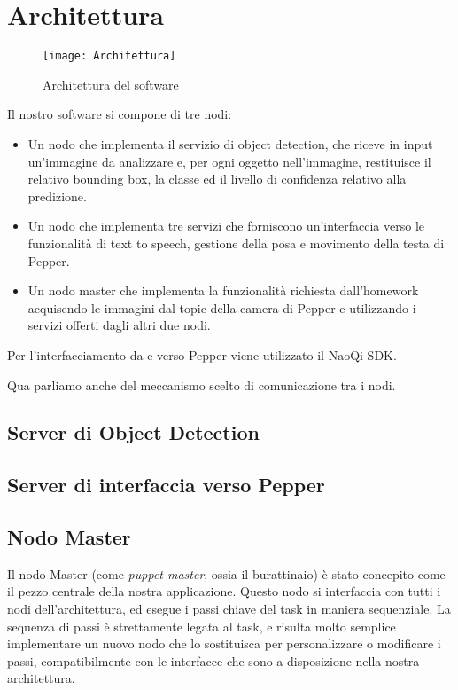 \section{Architettura}

\begin{figure}[ht]
	\centering
	\texttt{[image: Architettura]}
	\caption{Architettura del software}
	\label{fig:architecture}
\end{figure}

Il nostro software si compone di tre nodi:
\begin{itemize}
    \item Un nodo che implementa il servizio di object detection, che riceve in input un’immagine da analizzare e, per ogni oggetto nell’immagine, restituisce il relativo bounding box, la classe ed il livello di confidenza relativo alla predizione.
    \item Un nodo che implementa tre servizi che forniscono un’interfaccia verso le funzionalità di text to speech, gestione della posa e movimento della testa di Pepper.
    \item Un nodo master che implementa la funzionalità richiesta dall’homework acquisendo le immagini dal topic della camera di Pepper e utilizzando i servizi offerti dagli altri due nodi.
\end{itemize}
Per l’interfacciamento da e verso Pepper viene utilizzato il NaoQi SDK.

Qua parliamo anche del meccanismo scelto di comunicazione tra i nodi.


\subsection{Server di Object Detection}

\subsection{Server di interfaccia verso Pepper}

\subsection{Nodo Master}

Il nodo Master (come \emph{puppet master}, ossia il burattinaio) è stato concepito come il pezzo centrale della nostra applicazione. Questo nodo si interfaccia con tutti i nodi dell'architettura, ed esegue i passi chiave del task in maniera sequenziale. La sequenza di passi è strettamente legata al task, e risulta molto semplice implementare un nuovo nodo che lo sostituisca per personalizzare o modificare i passi, compatibilmente con le interfacce che sono a disposizione nella nostra architettura.

